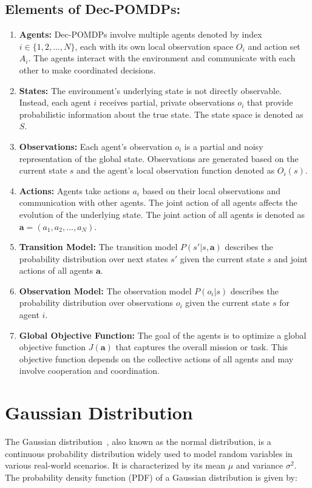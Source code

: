 \subsection{Elements of Dec-POMDPs:}\label{subsec:elements-of-dec-pomdps:}
\begin{enumerate}
    \item \textbf{Agents:} Dec-POMDPs involve multiple agents denoted by index $i \in \{1, 2, \ldots, N\}$, each with its own local observation space $O_i$ and action set $A_i$. The agents interact with the environment and communicate with each other to make coordinated decisions.
    \item \textbf{States:} The environment's underlying state is not directly observable. Instead, each agent $i$ receives partial, private observations $o_i$ that provide probabilistic information about the true state. The state space is denoted as $S$.
    \item \textbf{Observations:} Each agent's observation $o_i$ is a partial and noisy representation of the global state. Observations are generated based on the current state $s$ and the agent's local observation function denoted as $O_i(s)$.
    \item \textbf{Actions:} Agents take actions $a_i$ based on their local observations and communication with other agents. The joint action of all agents affects the evolution of the underlying state. The joint action of all agents is denoted as $\mathbf{a} = (a_1, a_2, \ldots, a_N)$.
    \item \textbf{Transition Model:} The transition model $P(s' | s, \mathbf{a})$ describes the probability distribution over next states $s'$ given the current state $s$ and joint actions of all agents $\mathbf{a}$.
    \item \textbf{Observation Model:} The observation model $P(o_i | s)$ describes the probability distribution over observations $o_i$ given the current state $s$ for agent $i$.
    \item \textbf{Global Objective Function:} The goal of the agents is to optimize a global objective function $J(\mathbf{a})$ that captures the overall mission or task. This objective function depends on the collective actions of all agents and may involve cooperation and coordination.

\end{enumerate}

\section{Gaussian Distribution}\label{sec:gaussian-distribution}
The Gaussian distribution~, also known as the normal distribution, is a continuous probability distribution widely used to model random variables in various real-world scenarios. It is characterized by its mean $\mu$ and variance $\sigma^2$. The probability density function (PDF) of a Gaussian distribution is given by:

